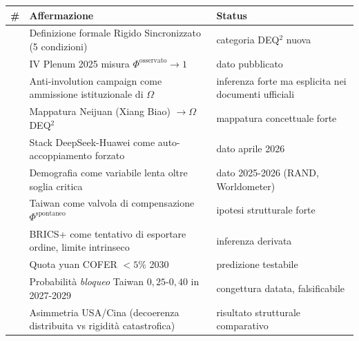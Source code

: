 {\def\LTcaptype{none} %
{\small\begin{longtable}[]{@{}
  >{\raggedright\arraybackslash}p{}
  >{\raggedright\arraybackslash}p{}
  >{\raggedright\arraybackslash}p{}@{}}
\toprule\noalign{}
\begin{minipage}[b]{\linewidth}\raggedright
\#
\end{minipage} & \begin{minipage}[b]{\linewidth}\raggedright
Affermazione
\end{minipage} & \begin{minipage}[b]{\linewidth}\raggedright
Status
\end{minipage} \\
\midrule\noalign{}
\endhead
\bottomrule\noalign{}
\endlastfoot
1 & Definizione formale Rigido Sincronizzato (5 condizioni) & \Hypoth{}
categoria DEQ$^2$ nuova \\
2 & IV Plenum 2025 misura \(\Phi^{\text{osservato}} \to 1\) & \Proved{}
dato pubblicato \\
3 & Anti-involution campaign come ammissione istituzionale di \(\Omega\)
& \Hypoth{} inferenza forte ma esplicita nei documenti ufficiali \\
4 & Mappatura Neijuan (Xiang Biao) \(\to \Omega\) DEQ$^2$ & \Hypoth{}
mappatura concettuale forte \\
5 & Stack DeepSeek-Huawei come auto-accoppiamento forzato & \Proved{}
dato aprile 2026 \\
6 & Demografia come variabile lenta oltre soglia critica & \Proved{}
dato 2025-2026 (RAND, Worldometer) \\
7 & Taiwan come valvola di compensazione \(\Phi^{\text{spontaneo}}\) &
\Conj{} ipotesi strutturale forte \\
8 & BRICS+ come tentativo di esportare ordine, limite intrinseco &
\Hypoth{} inferenza derivata \\
9 & Quota yuan COFER \(< 5\%\) 2030 & \Conj{} predizione testabile \\
10 & Probabilità \emph{bloqueo} Taiwan \(0{,}25\)-\(0{,}40\) in
2027-2029 & \Conj{} congettura datata, falsificabile \\
11 & Asimmetria USA/Cina (decoerenza distribuita vs rigidità
catastrofica) & \Hypoth{} risultato strutturale comparativo \\
\end{longtable}}
}



